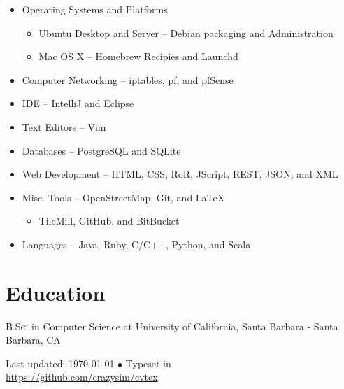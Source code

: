 \documentclass[10pt,a4paper]{article}
\newcommand{\years}[1]{\marginnote{#1}}
\begin{document}
\begin{itemize}
    \item Operating Systems and Platforms
        \begin{itemize}
            \item Ubuntu Desktop and Server -- Debian packaging and Administration
            \item Mac OS X -- Homebrew Recipies and Launchd
        \end{itemize}
    \item Computer Networking -- iptables, pf, and pfSense
    \item IDE -- IntelliJ and Eclipse
    \item Text Editors -- Vim
    \item Databases -- PostgreSQL and SQLite
    \item Web Development -- HTML, CSS, RoR, JScript, REST, JSON, and XML
    \item Misc. Tools -- OpenStreetMap, Git, and LaTeX
        \begin{itemize}
            \item TileMill, GitHub, and BitBucket
        \end{itemize}
    \item Languages -- Java, Ruby, C/C++, Python, and Scala
\end {itemize}

\section*{Education}

\years{2008-2012}\textsc{B.Sci} in Computer Science at University of California, Santa Barbara - Santa Barbara, CA



\vfill{}

\begin{center}
{\scriptsize  Last updated: \today\- $\bullet$\- 
Typeset in \href{http://nitens.org/taraborelli/cvtex}{\XeTeX}\\
\href{https://github.com/crazysim/cvtex}{https://github.com/crazysim/cvtex}}
\end{center}
\end{document}
